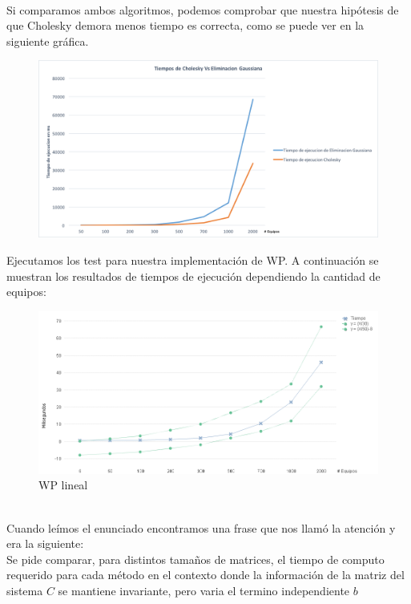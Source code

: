 \\

Si comparamos ambos algoritmos, podemos comprobar que nuestra hipótesis de que Cholesky demora menos tiempo es correcta, como se puede ver en la siguiente gráfica.

\begin{figure}[H]
    \centering
    \includegraphics[width=1\textwidth]{IMG/tiemposgsvscholesky.png}
\end{figure}


Ejecutamos los test para nuestra implementación de WP. A continuación se muestran los resultados de tiempos de ejecución dependiendo la cantidad de equipos: \\


\begin{figure}[H]
    \centering
    \includegraphics[width=1\textwidth]{IMG/wp lineal.png}
    \caption{WP lineal}
    \label{fig:WP lineal}
\end{figure}

\\
Cuando leímos el enunciado encontramos una frase que nos llamó la atención y era la siguiente: \\

Se pide comparar, para distintos tamaños de matrices, el tiempo de computo requerido para cada método en el contexto donde la información de la matriz del sistema $C$ se mantiene invariante,
pero varia el termino independiente $b$ \\

